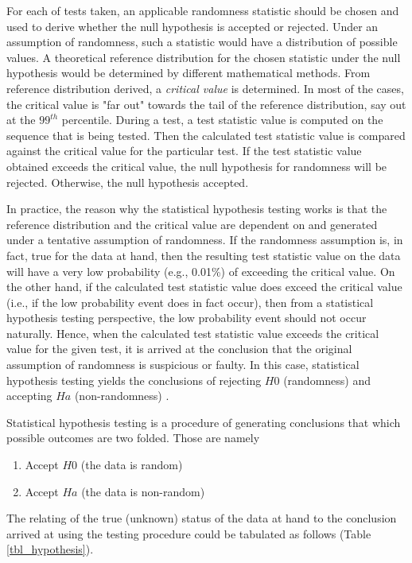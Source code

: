 For each of tests taken, an applicable randomness statistic should be chosen and used to derive whether the null hypothesis is accepted or rejected. Under an assumption of randomness, such a statistic would have a distribution of possible values. A theoretical reference distribution for the chosen statistic under the null hypothesis would be determined by different mathematical methods. From reference distribution derived, a \textit{critical value} is determined. In most of the cases, the critical value is "far out" towards the tail of the reference distribution, say out at the $99^{th}$ percentile. During a test, a test statistic value is computed on the sequence that is being tested. Then the calculated test statistic value is compared against the critical value for the particular test. If the test statistic value obtained exceeds the critical value, the null hypothesis for randomness will be rejected. Otherwise, the null hypothesis accepted.

In practice, the reason why the statistical hypothesis testing works is that the reference distribution and the critical value are dependent on and generated under a tentative assumption of randomness. If the randomness assumption is, in fact, true for the data at hand, then the resulting test statistic value on the data will have a very low probability (e.g., 0.01\%) of exceeding the critical value. On the other hand, if the calculated test statistic value does exceed the critical value (i.e., if the low probability event does in fact occur), then from a statistical hypothesis testing perspective, the low probability event should not occur naturally. Hence, when the calculated test statistic value exceeds the critical value for the given test, it is arrived at the conclusion that the original assumption of randomness is suspicious or faulty. In this case, statistical hypothesis testing yields the conclusions of  rejecting $H0$ (randomness) and accepting $Ha$ (non-randomness) \cite{rep_nist_sp_80022}.

Statistical hypothesis testing is a procedure of generating conclusions that which possible outcomes are two folded. Those are namely

\begin{enumerate}
    \item Accept $H0$ (the data is random)
    \item Accept $Ha$ (the data is non-random)
\end{enumerate}

The relating of the true (unknown) status of the data at hand to the conclusion arrived at using the testing procedure could be tabulated as follows (Table \ref{tbl_hypothesis}).

